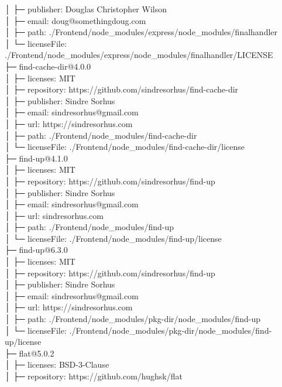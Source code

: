 │  ├─ publisher: Douglas Christopher Wilson\\
│  ├─ email: doug@somethingdoug.com\\
│  ├─ path: ./Frontend/node\_modules/express/node\_modules/finalhandler\\
│  └─ licenseFile: ./Frontend/node\_modules/express/node\_modules/finalhandler/LICENSE\\
├─ find-cache-dir@4.0.0\\
│  ├─ licenses: MIT\\
│  ├─ repository: https://github.com/sindresorhus/find-cache-dir\\
│  ├─ publisher: Sindre Sorhus\\
│  ├─ email: sindresorhus@gmail.com\\
│  ├─ url: https://sindresorhus.com\\
│  ├─ path: ./Frontend/node\_modules/find-cache-dir\\
│  └─ licenseFile: ./Frontend/node\_modules/find-cache-dir/license\\
├─ find-up@4.1.0\\
│  ├─ licenses: MIT\\
│  ├─ repository: https://github.com/sindresorhus/find-up\\
│  ├─ publisher: Sindre Sorhus\\
│  ├─ email: sindresorhus@gmail.com\\
│  ├─ url: sindresorhus.com\\
│  ├─ path: ./Frontend/node\_modules/find-up\\
│  └─ licenseFile: ./Frontend/node\_modules/find-up/license\\
├─ find-up@6.3.0\\
│  ├─ licenses: MIT\\
│  ├─ repository: https://github.com/sindresorhus/find-up\\
│  ├─ publisher: Sindre Sorhus\\
│  ├─ email: sindresorhus@gmail.com\\
│  ├─ url: https://sindresorhus.com\\
│  ├─ path: ./Frontend/node\_modules/pkg-dir/node\_modules/find-up\\
│  └─ licenseFile: ./Frontend/node\_modules/pkg-dir/node\_modules/find-up/license\\
├─ flat@5.0.2\\
│  ├─ licenses: BSD-3-Clause\\
│  ├─ repository: https://github.com/hughsk/flat\\
